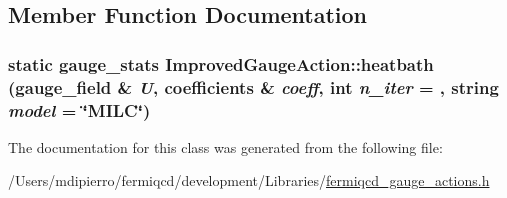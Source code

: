 \subsection{Member Function Documentation}
\hypertarget{class_improved_gauge_action_a02e55d57665313eb939b9b6e77697680}{
\subsubsection[{heatbath}]{\setlength{\rightskip}{0pt plus 5cm}static {\bf gauge\_\-stats} ImprovedGaugeAction::heatbath ({\bf gauge\_\-field} \& {\em U}, \/  {\bf coefficients} \& {\em coeff}, \/  int {\em n\_\-iter} = {}, \/  string {\em model} = {\ttfamily \char`\"{}MILC\char`\"{}})}}
\label{class_improved_gauge_action_a02e55d57665313eb939b9b6e77697680}


The documentation for this class was generated from the following file:\begin{DoxyCompactItemize}
\item 
/Users/mdipierro/fermiqcd/development/Libraries/\hyperlink{fermiqcd__gauge__actions_8h}{fermiqcd\_\-gauge\_\-actions.h}\end{DoxyCompactItemize}
